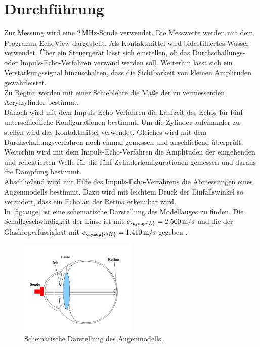 \newpage

\section{Durchführung}
\label{sec:Durchfuehrung}
Zur Messung wird eine $2\,\unit{\mega\hertz}$-Sonde verwendet. Die Messwerte werden mit dem Programm EchoView
dargestellt. Als Kontaktmittel wird bidestilliertes Wasser verwendet. Über ein Steuergerät lässt sich einstellen,
ob das Durchschallungs- oder Impuls-Echo-Verfahren verwand werden soll. Weiterhin lässt sich ein
Verstärkungssignal hinzuschalten, dass die Sichtbarkeit von kleinen Amplituden gewährleistet.\\
Zu Beginn werden mit einer Schieblehre die Maße der zu vermessenden Acrylzylinder bestimmt. \\
Danach wird mit dem Impuls-Echo-Verfahren die Laufzeit des Echos für fünf unterschiedliche Konfigurationen bestimmt. Um die
Zylinder aufeinander zu stellen wird das Kontaktmittel verwendet. Gleiches wird mit dem Durchschallungsverfahren
noch einmal gemessen und anschließend überprüft. \\
Weiterhin wird mit dem Impuls-Echo-Verfahren die
Amplituden der eingehenden und reflektierten Welle für die fünf Zylinderkonfigurationen gemessen und daraus die
Dämpfung bestimmt. \\
Abschließend wird mit Hilfe des Impuls-Echo-Verfahrens die Abmessungen eines Augenmodells
bestimmt. Dazu wird mit leichtem Druck der Einfallswinkel so verändert, dass ein Echo an der Retina erkennbar
wird.\\
In \autoref{fig:auge} ist eine schematische Darstellung des Modellauges zu finden. Die
Schallgeschwindigkeit der Linse ist mit $c_{\symup{L}} = 2.500\,\unit{\meter\per\second}$ und die der
Glaskörperfüssigkeit mit $c_{\symup{GK}} = 1.410\,\unit{\meter\per\second}$ gegeben \cite{sample}.

\begin{figure}
    \centering
    \includegraphics[width=0.5\textwidth]{messwerte/Versuchsaufbau.png}
    \caption{Schematische Darstellung des Augenmodells.}
    \label{fig:auge}
\end{figure}